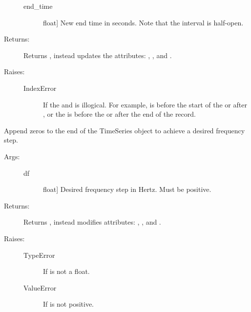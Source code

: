 \documentclass[letterpaper,10pt,english]{sphinxmanual}
\begin{document}
\begin{fulllineitems}
\begin{fulllineitems}
\begin{description}
\begin{description}
\item[{end\_time}] \leavevmode{[}float{]}
New end time in seconds. Note that the interval is
half-open.

\end{description}

\item[{Returns:}] \leavevmode
Returns , instead updates the attributes: , 
, and .

\item[{Raises:}] \leavevmode\begin{description}
\item[{IndexError }] \leavevmode
If the  and  is illogical.
For example,  is before the start of the
 or after , or the  is
before the  or after the end of the record.

\end{description}

\end{description}

\end{fulllineitems}



\begin{fulllineitems}
Append zeros to the end of the TimeSeries object to achieve a
desired frequency step.
\begin{description}
\item[{Args:}] \leavevmode\begin{description}
\item[{df}] \leavevmode{[}float{]}
Desired frequency step in Hertz. Must be positive.

\end{description}

\item[{Returns:}] \leavevmode
Returns , instead modifies attributes: ,
, and .

\item[{Raises:}] \leavevmode\begin{description}
\item[{TypeError}] \leavevmode
If  is not a float.

\item[{ValueError}] \leavevmode
If  is not positive.

\end{description}

\end{description}

\end{fulllineitems}


\end{fulllineitems}
\end{document}
